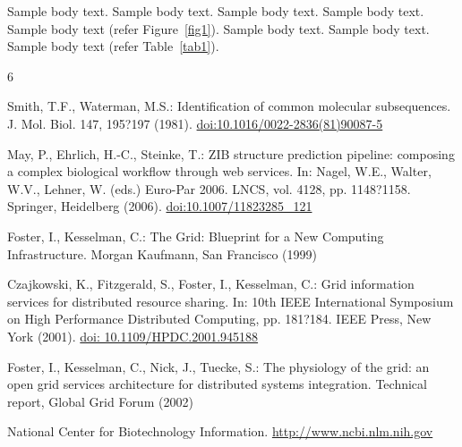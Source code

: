 \documentclass{svproc}
\begin{document}
Sample body text. Sample body text. Sample body text. Sample body text. Sample body text (refer Figure~\ref{fig1}). Sample body text. Sample body text. Sample body text (refer Table~\ref{tab1}). 



%
%
\begin{thebibliography}{6}
%

Smith, T.F., Waterman, M.S.: Identification of common molecular subsequences.
J. Mol. Biol. 147, 195?197 (1981). \url{doi:10.1016/0022-2836(81)90087-5}

May, P., Ehrlich, H.-C., Steinke, T.: ZIB structure prediction pipeline:
composing a complex biological workflow through web services.
In: Nagel, W.E., Walter, W.V., Lehner, W. (eds.) Euro-Par 2006.
LNCS, vol. 4128, pp. 1148?1158. Springer, Heidelberg (2006).
\url{doi:10.1007/11823285_121}

Foster, I., Kesselman, C.: The Grid: Blueprint for a New Computing Infrastructure.
Morgan Kaufmann, San Francisco (1999)

Czajkowski, K., Fitzgerald, S., Foster, I., Kesselman, C.: Grid information services
for distributed resource sharing. In: 10th IEEE International Symposium
on High Performance Distributed Computing, pp. 181?184. IEEE Press, New York (2001).
\url{doi: 10.1109/HPDC.2001.945188}

Foster, I., Kesselman, C., Nick, J., Tuecke, S.: The physiology of the grid: an open grid services architecture for distributed systems integration. Technical report, Global Grid
Forum (2002)

National Center for Biotechnology Information. \url{http://www.ncbi.nlm.nih.gov}


\end{thebibliography}

\end{document}
